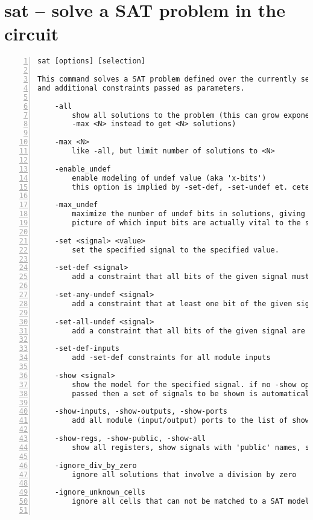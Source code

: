 \section{sat -- solve a SAT problem in the circuit}
\label{cmd:sat}
\begin{lstlisting}[numbers=left,frame=single]
    sat [options] [selection]

This command solves a SAT problem defined over the currently selected circuit
and additional constraints passed as parameters.

    -all
        show all solutions to the problem (this can grow exponentially, use
        -max <N> instead to get <N> solutions)

    -max <N>
        like -all, but limit number of solutions to <N>

    -enable_undef
        enable modeling of undef value (aka 'x-bits')
        this option is implied by -set-def, -set-undef et. cetera

    -max_undef
        maximize the number of undef bits in solutions, giving a better
        picture of which input bits are actually vital to the solution.

    -set <signal> <value>
        set the specified signal to the specified value.

    -set-def <signal>
        add a constraint that all bits of the given signal must be defined

    -set-any-undef <signal>
        add a constraint that at least one bit of the given signal is undefined

    -set-all-undef <signal>
        add a constraint that all bits of the given signal are undefined

    -set-def-inputs
        add -set-def constraints for all module inputs

    -show <signal>
        show the model for the specified signal. if no -show option is
        passed then a set of signals to be shown is automatically selected.

    -show-inputs, -show-outputs, -show-ports
        add all module (input/output) ports to the list of shown signals

    -show-regs, -show-public, -show-all
        show all registers, show signals with 'public' names, show all signals

    -ignore_div_by_zero
        ignore all solutions that involve a division by zero

    -ignore_unknown_cells
        ignore all cells that can not be matched to a SAT model


\end{lstlisting}
